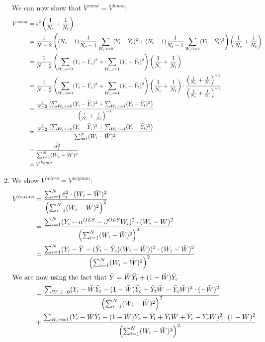 \documentclass{article}
\begin{document}
\begin{enumerate}[label=(\alph*)]
		We can now show that $V^{const} = V^{homo}$:
		\begin{align}
			V^{const} &= s^2\left(\frac{1}{N_c} + \frac{1}{N_t}\right) \notag \\
			&= \frac{1}{N-2}\left((N_c-1)\frac{1}{N_c-1}\sum_{W_i:i=0}(Y_i-\bar{Y}_c)^2 + (N_t-1)\frac{1}{N_t-1}\sum_{W_i:i=1}(Y_i-\bar{Y}_t)^2\right)\left(\frac{1}{N_c} + \frac{1}{N_t}\right) \notag \\
			&= \frac{1}{N-2}\left(\sum_{W_i:i=0}(Y_i-\bar{Y}_c)^2 + \sum_{W_i:i=1}(Y_i-\bar{Y}_t)^2\right)\left(\frac{1}{N_c} + \frac{1}{N_t}\right) \notag \\
			&= \frac{1}{N-2}\left(\sum_{W_i:i=0}(Y_i-\bar{Y}_c)^2 + \sum_{W_i:i=1}(Y_i-\bar{Y}_t)^2\right)\left(\frac{1}{N_c} + \frac{1}{N_t}\right) \cdot \frac{\left(\frac{1}{N_c} + \frac{1}{N_t}\right)^{-1}}{\left(\frac{1}{N_c} + \frac{1}{N_t}\right)^{-1}} \notag \\
			&= \frac{\frac{1}{N-2}\left(\sum_{W_i:i=0}(Y_i-\bar{Y}_c)^2 + \sum_{W_i:i=1}(Y_i-\bar{Y}_t)^2\right)}{\left(\frac{1}{N_c} + \frac{1}{N_t}\right)^{-1}} \notag \\
			&= \frac{\frac{1}{N-2}\left(\sum_{W_i:i=0}(Y_i-\bar{Y}_c)^2 + \sum_{W_i:i=1}(Y_i-\bar{Y}_t)^2\right)}{\sum_{i=1}^N (W_i-\bar{W})^2} \notag \\
			&= \frac{\hat{\sigma^2_\varepsilon}}{\sum_{i=1}^N (W_i-\bar{W})^2} \notag \\
			&= V^{homo} \notag
		\end{align}
		\item We show $V^{hetero} = V^{neyman}$:
		\begin{align}
			V^{hetero} &= \frac{\sum_{i=1}^N \hat{\varepsilon}_i^2\cdot (W_i-\bar{W})^2}{\left(\sum_{i=1}^N (W_i-\bar{W})^2\right)^2} \notag \\
			&= \frac{\sum_{i=1}^N (Y_i-\alpha^{OLS} - \beta^{OLS}W_i)^2\cdot (W_i-\bar{W})^2}{\left(\sum_{i=1}^N (W_i-\bar{W})^2\right)^2} \notag \\
			&= \frac{\sum_{i=1}^N (Y_i-\bar{Y}-(\bar{Y}_t - \bar{Y}_c)(W_i-\bar{W}))^2\cdot (W_i-\bar{W})^2}{\left(\sum_{i=1}^N (W_i-\bar{W})^2\right)^2} \notag \\
			\intertext{We are now using the fact that $\bar{Y} = \bar{W}\bar{Y}_t + (1-\bar{W})\bar{Y}_c$}
			&= \frac{\sum_{W_i:i=0} (Y_i-\bar{W}\bar{Y}_t - (1-\bar{W})\bar{Y}_c + \bar{Y}_t\bar{W} - \bar{Y}_c\bar{W})^2\cdot (-\bar{W})^2}{\left(\sum_{i=1}^N (W_i-\bar{W})^2\right)^2} \notag \\
			&+ \frac{\sum_{W_i:i=1} (Y_i-\bar{W}\bar{Y}_t - (1-\bar{W})\bar{Y}_c - \bar{Y}_t + \bar{Y}_t\bar{W} + \bar{Y}_c - \bar{Y}_c\bar{W})^2\cdot (1-\bar{W})^2}{\left(\sum_{i=1}^N (W_i-\bar{W})^2\right)^2} \notag \\

\end{align}
\end{enumerate}
\end{document}
